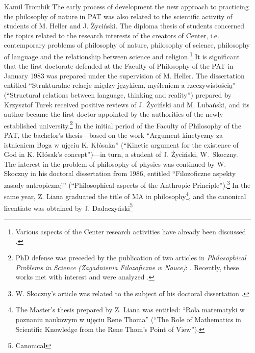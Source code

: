 \begin{artengenv}{Kamil Trombik}
The early process of development the new approach to practicing the philosophy of nature in PAT was also related to the
scientific activity of students of M. Heller and J. Życiński. The diploma thesis of students concerned the topics
related to the research interests of the creators of Center, i.e. contemporary problems of philosophy of nature,
philosophy of science, philosophy of language and the relationship between science and religion.\footnote{Various
aspects of the Center research activities have already been discussed
\parencite[see e.g.][]{krauze_jedna_2008,maczka_badania_2012,skoczny_filozofia_2012}.
} It is significant that the first doctorate defended at the Faculty of Philosophy
of the PAT in January 1983 was prepared under the supervision of M. Heller. The dissertation entitled ``Strukturalne
relacje między językiem, myśleniem a rzeczywistością'' (``Structural relations between language, thinking and reality'')
prepared by Krzysztof Turek received positive reviews of J. Życiński and M. Lubański, and its author became the first
doctor appointed by the authorities of the newly established university.\footnote{PhD defense was preceded by the
publication of two articles in \textit{Philosophical Problems in Science (Zagadnienia Filozoficzne w Nauce)}:
\parencite{turek_filozoficzne_1978,turek_rozwazania_1981}.
Recently, these works met with interest and were analyzed
\parencite{krzanowski_towards_2016}.
} In the initial period of the Faculty of Philosophy of the PAT, the
bachelor's thesis---based on the work ``Argument kinetyczny za istnieniem Boga w ujęciu K. Kłósaka'' (``Kinetic argument for
the existence of God in K. Kłósak's concept'')---in turn, a student of J. Życiński, W.~Skoczny. The interest in the
problem of philosophy of physics was continued by W. Skoczny in his doctoral dissertation from 1986, entitled
``Filozoficzne aspekty zasady antropicznej'' (``Philosophical aspects of the Anthropic Principle'').\footnote{W. Skoczny's
article was related to the subject of his doctoral dissertation
\parencite{skoczny_glowne_1985}.
} In the same
year, Z. Liana graduated the title of MA in philosophy\footnote{The Master's thesis prepared by Z. Liana was entitled:
``Rola matematyki w poznaniu naukowym w ujęciu Rene Thoma'' (``The Role of Mathematics in Scientific Knowledge from the
Rene Thom's Point of View'').}, and the canonical licentiate was obtained by J. Dadaczyński\footnote{Canonical
}
\end{artengenv}

